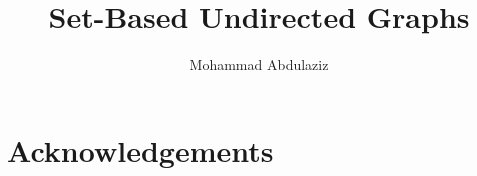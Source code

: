 \documentclass[11pt,a4paper]{article}
\begin{document}
\title{Set-Based Undirected Graphs}
\author{Mohammad Abdulaziz}
\maketitle

\begin{abstract}
\end{abstract}


\section{Acknowledgements}





\end{document}
